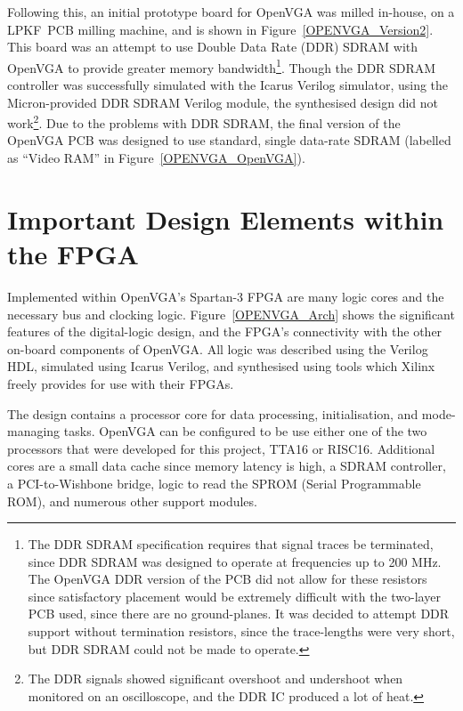 Following this, an initial prototype board for OpenVGA was milled in-house, on a
LPKF\texttrademark~PCB milling machine, and is shown in
Figure~\ref{OPENVGA_Version2}. This board was an attempt to use Double Data
Rate (DDR) SDRAM with
OpenVGA to provide greater memory bandwidth\footnote{The DDR SDRAM specification
requires that signal traces be terminated, since DDR SDRAM was designed to
operate at frequencies up to 200 MHz. The OpenVGA DDR version of the PCB did not
allow for these resistors since satisfactory placement would be extremely
difficult with the two-layer PCB used, since there are no ground-planes. It was
decided to attempt DDR support without termination resistors, since the
trace-lengths were very short, but DDR SDRAM could not be made to operate.}.
Though the DDR SDRAM controller was successfully simulated with the Icarus
Verilog simulator, using the Micron-provided DDR SDRAM Verilog module, the
synthesised design did not work\footnote{The DDR signals showed significant
overshoot and undershoot when monitored on an oscilloscope, and the DDR IC
produced a lot of heat.}. Due to the problems with DDR SDRAM, the final version
of the OpenVGA PCB was designed to use standard, single data-rate SDRAM (labelled
as ``Video RAM'' in Figure~\ref{OPENVGA_OpenVGA}).


\section{Important Design Elements within the FPGA}
\label{OPENVGA_Logic_Cores}
Implemented within OpenVGA's Spartan-3 FPGA are many logic cores and the
necessary bus and clocking logic. Figure~\ref{OPENVGA_Arch} shows the significant
features of the digital-logic design, and the FPGA's connectivity with the other
on-board components of OpenVGA. All logic was described using the Verilog HDL,
simulated using Icarus Verilog, and synthesised using tools which Xilinx freely
provides for use with their FPGAs.

The design contains a processor core for data processing, initialisation, and
mode-managing tasks. OpenVGA can be configured to be use either one of the two
processors that were developed for this project, TTA16 or RISC16. Additional
cores are a small data cache since memory latency is high, a SDRAM controller, a
PCI-to-Wishbone bridge, logic to read the SPROM (Serial Programmable ROM),
and numerous other support modules.

